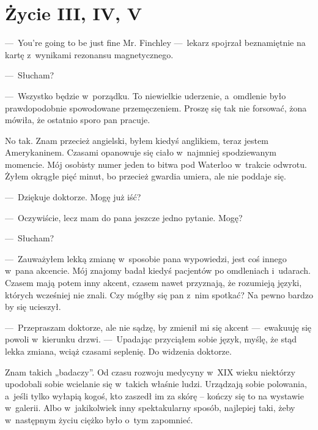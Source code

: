 \chapter{Życie III, IV, V}

---~You're going to be just fine Mr. Finchley ---~lekarz spojrzał beznamiętnie na kartę z~wynikami rezonansu magnetycznego.

---~Słucham?

---~Wszystko będzie w~porządku. To niewielkie uderzenie, a~omdlenie było prawdopodobnie spowodowane przemęczeniem. Proszę się tak nie forsować, żona mówiła, że ostatnio sporo pan pracuje.

No tak. Znam przecież angielski, byłem kiedyś anglikiem, teraz jestem Amerykaninem. Czasami opanowuje się ciało w~najmniej spodziewanym momencie. Mój osobisty numer jeden to bitwa pod Waterloo w~trakcie odwrotu. Żyłem okrągłe pięć minut, bo przecież gwardia umiera, ale nie poddaje się.

---~Dziękuje doktorze. Mogę już iść?

---~Oczywiście, lecz mam do pana jeszcze jedno pytanie. Mogę?

---~Słucham?

---~Zauważyłem lekką zmianę w~sposobie pana wypowiedzi, jest coś innego w~pana akcencie. Mój znajomy badał kiedyś pacjentów po omdleniach i~udarach. Czasem mają potem inny akcent, czasem nawet przyznają, że rozumieją języki, których wcześniej nie znali. Czy mógłby się pan z~nim spotkać? Na pewno bardzo by się ucieszył.

---~Przepraszam doktorze, ale nie sądzę, by zmienił mi się akcent ---~ewakuuję się powoli w~kierunku drzwi. ---~Upadając przyciąłem sobie język, myślę, że stąd lekka zmiana, wciąż czasami seplenię. Do widzenia doktorze.

\paraSep

Znam takich „badaczy”. Od czasu rozwoju medycyny w~XIX wieku niektórzy upodobali sobie wcielanie się w~takich właśnie ludzi. Urządzają sobie polowania, a~jeśli tylko wyłapią kogoś, kto zaszedł im za skórę -- kończy się to na wystawie w~galerii. Albo w~jakikolwiek inny spektakularny sposób, najlepiej taki, żeby w~następnym życiu ciężko było o~tym zapomnieć.

